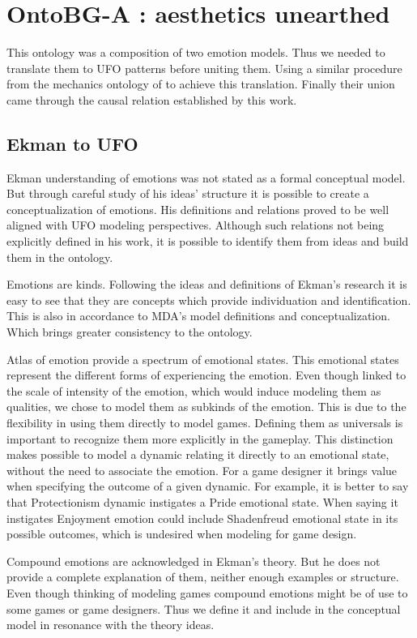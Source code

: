 \section{OntoBG-A : aesthetics unearthed}

This ontology was a composition of two emotion models. Thus we needed to translate them to UFO patterns before uniting them. Using a similar procedure from the mechanics ontology of \cite{kritz_buildingOntology} to achieve this translation. Finally their union came through the causal relation established by this work.

\subsection{Ekman to UFO}
Ekman understanding of emotions was not stated as a formal conceptual model. But through careful study of his ideas' structure it is possible to create a conceptualization of emotions. His definitions and relations proved to be well aligned with UFO modeling perspectives. Although such relations not being explicitly defined in his work, it is possible to identify them from ideas and build them in the ontology.

Emotions are kinds. Following the ideas and definitions of Ekman's research it is easy to see that they are concepts which provide individuation and identification. This is also in accordance to MDA's model definitions and conceptualization. Which brings greater consistency to the ontology.

Atlas of emotion provide a spectrum of emotional states. This emotional states represent the different forms of experiencing the emotion. Even though linked to the scale of intensity of the emotion, which would induce modeling them as qualities, we chose to model them as subkinds of the emotion. This is due to the flexibility in using them directly to model games. Defining them as universals is important to recognize them more explicitly in the gameplay. This distinction makes possible to model a dynamic relating it directly to an emotional state, without the need to associate the emotion. For a game designer it brings value when specifying the outcome of a given dynamic. For example, it is better to say that Protectionism dynamic instigates a Pride emotional state. When saying it instigates Enjoyment emotion could include Shadenfreud emotional state in its possible outcomes, which is undesired when modeling for game design.

Compound emotions are acknowledged in Ekman's theory. But he does not provide a complete explanation of them, neither enough examples or structure. Even though thinking of modeling games compound emotions might be of use to some games or game designers. Thus we define it and include in the conceptual model in resonance with the theory ideas.

